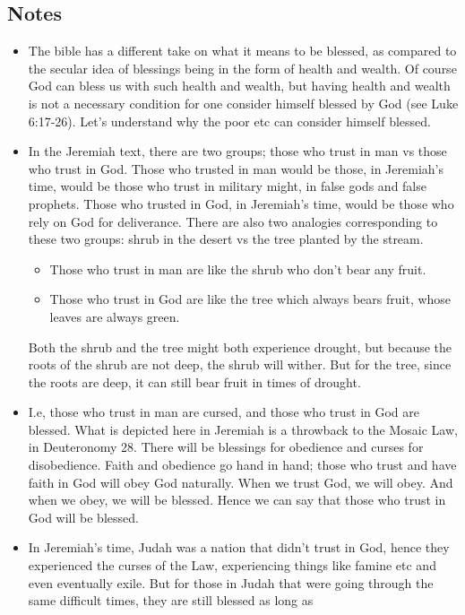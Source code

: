 \subsection*{Notes}
\begin{itemize}
  \item{The bible has a different take on what it means to be blessed, as
  compared to the secular idea of blessings being in the form of health and
  wealth.  Of course God can bless us with such health and wealth, but having
  health and wealth is not a necessary condition for one consider himself
  blessed by God (see Luke 6:17-26).  Let's understand why the poor etc can
  consider himself blessed.}
  \item{In the Jeremiah text, there are two groups; those who trust in man vs
  those who trust in God.  Those who trusted in man would be those, in
  Jeremiah's time, would be those who trust in military might, in false gods
  and false prophets.  Those who trusted in God, in Jeremiah's time, would be
  those who rely on God for deliverance.  There are also two analogies
  corresponding to these two groups: shrub in the desert vs the tree planted
  by the stream.
  \begin{itemize}
    \item{Those who trust in man are like the shrub who don't bear any fruit.}
    \item{Those who trust in God are like the tree which always bears fruit,
    whose leaves are always green.}
  \end{itemize} Both the shrub and the tree might both experience drought,
  but because the roots of the shrub are not deep, the shrub will wither.
  But for the tree, since the roots are deep, it can still bear fruit in
  times of drought.}
  \item{I.e, those who trust in man are cursed, and those who trust in God
  are blessed.  What is depicted here in Jeremiah is a throwback to the
  Mosaic Law, in Deuteronomy 28.  There will be blessings for obedience and
  curses for disobedience.  Faith and obedience go hand in hand; those who
  trust and have faith in God will obey God naturally.  When we trust God, we
  will obey.  And when we obey, we will be blessed.  Hence we can say that
  those who trust in God will be blessed.}
  \item{In Jeremiah's time, Judah was a nation that didn't trust in God,
  hence they experienced the curses of the Law, experiencing things like
  famine etc and even eventually exile.  But for those in Judah that were
  going through the same difficult times, they are still blessed as long as
}
\end{itemize}
